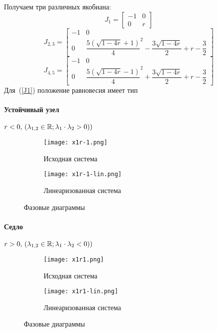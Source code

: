    Получаем три различных якобиана:
    \begin{equation}
        \label{J1}
        J_1=
        \begin{bmatrix}
            -1& 0\\
            0& r
        \end{bmatrix}
    \end{equation}
    \begin{equation}
        \label{J23}
        J_{2,3}=
        \begin{bmatrix}
            -1& 0\\
            0& \dfrac{5\left( \sqrt{1 - 4r} + 1 \right)}{4}^2 - \dfrac{3\sqrt{1 - 4r}}{2} + r - \dfrac{3}{2}
        \end{bmatrix}
    \end{equation}
    \begin{equation}
        \label{J45}
        J_{4,5}=
        \begin{bmatrix}
            -1& 0\\
            0& \dfrac{5\left( \sqrt{1 - 4r} - 1 \right)}{4}^2 + \dfrac{3\sqrt{1 - 4r}}{2} + r - \dfrac{3}{2}
        \end{bmatrix}
    \end{equation}
    Для~(\ref{J1}) положение равновесия имеет тип
    \paragraph*{Устойчивый узел} $r < 0 ,\,(\lambda_{1, 2} \in \operatorname{\mathbb{R}}; \lambda_1\cdot\lambda_2 > 0))$\nopagebreak
    \begin{figure}[H]
        \begin{subfigure}{0.5\linewidth}
            \texttt{[image: x1r-1.png]}
            \caption{Исходная система}
        \end{subfigure}
        \begin{subfigure}{0.5\linewidth}
            \texttt{[image: x1r-1-lin.png]}
            \caption{Линеаризованная система}
        \end{subfigure}
        \caption{Фазовые диаграммы}
    \end{figure}

    \paragraph*{Седло} $r > 0 ,\,(\lambda_{1, 2} \in \operatorname{\mathbb{R}}; \lambda_1\cdot\lambda_2 < 0))$\nopagebreak
    \begin{figure}[H]
        \begin{subfigure}{0.5\linewidth}
            \texttt{[image: x1r1.png]}
            \caption{Исходная система}
        \end{subfigure}
        \begin{subfigure}{0.5\linewidth}
            \texttt{[image: x1r1-lin.png]}
            \caption{Линеаризованная система}
        \end{subfigure}
        \caption{Фазовые диаграммы}
    \end{figure}

